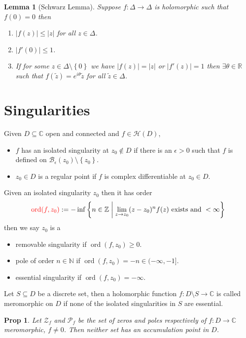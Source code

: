 \documentclass[11pt]{article}
\newcommand{\defeq}{:=}
\newcommand{\abs}[1]{\left|#1\right|}
\DeclareMathOperator{\ord}{\text{ord}}
\newcommand{\relmiddle}[1]{\mathrel{}\middle#1\mathrel{}}
\newcommand{\rmv}{\relmiddle|}
\newcommand{\R}{\mathbb{R}}
\newcommand{\C}{\mathbb{C}}
\newcommand{\Z}{\mathbb{Z}}
\newcommand{\N}{\mathbb{N}}
\newenvironment{defin}
	{\begin{mdframed}[backgroundcolor=white, roundcorner=5pt, linewidth=1pt]}
	{\end{mdframed}}
\newcommand{\mdf}[1]{{\color{red} #1}}
\newtheorem{prop}[theorem]{Prop}
\newtheorem{lemma}[theorem]{Lemma}
\begin{document}
\begin{lemma}[Schwarz Lemma]
Suppose $f:\Delta\to\Delta$ is holomorphic such that $f(0)=0$ then
\begin{enumerate}[label=(\roman*)]
	\item $\abs{f(z)}\leq\abs{z}$ for all $z\in\Delta$.
	\item $\abs{f'(0)}\leq 1$.
	\item If for some $z\in\Delta\setminus\left\{0\right\}$ we have $\abs{f(z)}=\abs{z}$ or $\abs{f'(z)}=1$ then $\exists\theta\in\R$ such that $f(\widetilde{z})=e^{i\theta}\widetilde{z}$ for all $\widetilde{z}\in\Delta$.
\end{enumerate}
\end{lemma}

\section{Singularities}

\begin{defin}
	Given $D\subseteq \C$ open and connected and $f\in\mathcal{H}(D)$,
	\begin{itemize}
		\item $f$ has an \mdf{isolated singularity} at $z_0\not\in D$ if there is an $\epsilon >0$ such that $f$ is defined on $\mathcal{B}_\epsilon(z_0)\setminus\left\{z_0\right\}$.
		\item $z_0\in D$ is a \mdf{regular point} if $f$ is complex differentiable at $z_0\in D$.
	\end{itemize}
	Given an isolated singularity $z_0$ then it has \mdf{order}
	\[
		\mdf{\ord(f,z_0)}\defeq-\inf\left\{n\in\Z \rmv \lim_{z\to z_0} (z-z_0)^n f(z) \text{ exists and }<\infty\right\}
	\]
	then we say $z_0$ is a
	\begin{itemize}
		\item \mdf{removable singularity} if $\ord(f,z_0)\geq 0$.
		\item \mdf{pole of order $n\in\N$} if $\ord(f, z_0)=-n\in(-\infty, -1]$.
		\item \mdf{essential singularity} if $\ord(f, z_0)=-\infty$.
	\end{itemize}
	Let $S\subseteq D$ be a discrete set, then a holomorphic function $f:D\setminus S\to\C$ is called \mdf{meromorphic on $D$} if none of the isolated singularities in $S$ are essential.
\end{defin}

\begin{prop}
Let $\mathcal{Z}_f$ and $\mathcal{P}_f$ be the set of zeros and poles respectively of $f:D\to\C$ meromorphic, $f\neq 0$.
Then neither set has an accumulation point in $D$.
\end{prop}
\end{document}
